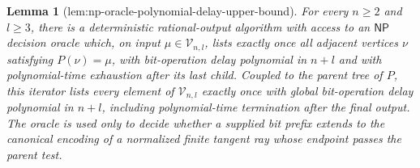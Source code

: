 \documentclass{article}
\newtheorem{lemma}{Lemma}
\begin{document}
\begin{lemma}[lem:np-oracle-polynomial-delay-upper-bound]\label{lem:np-oracle-polynomial-delay-upper-bound}
For every \(n\ge2\) and \(l\ge3\), there is a deterministic rational-output algorithm with access to an \(\mathsf{NP}\) decision oracle which, on input \(\mu\in\mathcal V_{n,l}\), lists exactly once all adjacent vertices \(\nu\) satisfying \(P(\nu)=\mu\), with bit-operation delay polynomial in \(n+l\) and with polynomial-time exhaustion after its last child. Coupled to the parent tree of \(P\), this iterator lists every element of \(\mathcal V_{n,l}\) exactly once with global bit-operation delay polynomial in \(n+l\), including polynomial-time termination after the final output. The oracle is used only to decide whether a supplied bit prefix extends to the canonical encoding of a normalized finite tangent ray whose endpoint passes the parent test.
\end{lemma}
\end{document}
